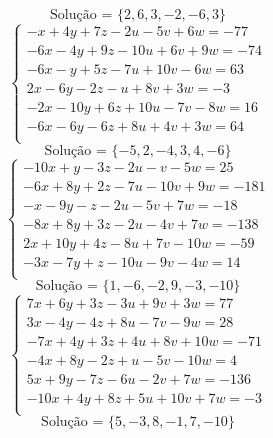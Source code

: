 \documentclass[12pt,oneside,a4paper]{article}
\begin{document}
\begin{equation*}
\text{Solução = }\{2,6,3,-2,-6,3\}
\end{equation*}
\vspace{\baselineskip}
\begin{equation*}
\begin{cases}
-x+4y+7z-2u-5v+6w=-77 \\
-6x-4y+9z-10u+6v+9w=-74 \\
-6x-y+5z-7u+10v-6w=63 \\
2x-6y-2z-u+8v+3w=-3 \\
-2x-10y+6z+10u-7v-8w=16 \\
-6x-6y-6z+8u+4v+3w=64 \\
\end{cases}
\end{equation*}
\begin{equation*}
\text{Solução = }\{-5,2,-4,3,4,-6\}
\end{equation*}
\vspace{\baselineskip}
\begin{equation*}
\begin{cases}
-10x+y-3z-2u-v-5w=25 \\
-6x+8y+2z-7u-10v+9w=-181 \\
-x-9y-z-2u-5v+7w=-18 \\
-8x+8y+3z-2u-4v+7w=-138 \\
2x+10y+4z-8u+7v-10w=-59 \\
-3x-7y+z-10u-9v-4w=14 \\
\end{cases}
\end{equation*}
\begin{equation*}
\text{Solução = }\{1,-6,-2,9,-3,-10\}
\end{equation*}
\vspace{\baselineskip}
\begin{equation*}
\begin{cases}
7x+6y+3z-3u+9v+3w=77 \\
3x-4y-4z+8u-7v-9w=28 \\
-7x+4y+3z+4u+8v+10w=-71 \\
-4x+8y-2z+u-5v-10w=4 \\
5x+9y-7z-6u-2v+7w=-136 \\
-10x+4y+8z+5u+10v+7w=-3 \\
\end{cases}
\end{equation*}
\begin{equation*}
\text{Solução = }\{5,-3,8,-1,7,-10\}
\end{equation*}
\end{document}
